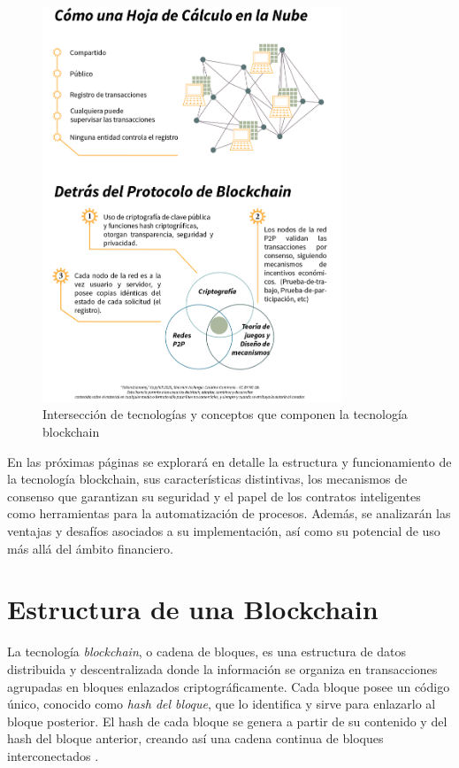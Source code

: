 \begin{figure}[!htpb]
    \centering
    \includegraphics[width=0.8\textwidth]{Figures/venn-blockchain.png}
    \caption{Intersección de tecnologías y conceptos que componen la tecnología blockchain}
    \label{fig:blockchain-venn}
\end{figure}

En las próximas páginas se explorará en detalle la estructura y funcionamiento de la tecnología blockchain, sus características distintivas, los mecanismos de consenso que garantizan su seguridad y el papel de los contratos inteligentes como herramientas para la automatización de procesos. Además, se analizarán las ventajas y desafíos asociados a su implementación, así como su potencial de uso más allá del ámbito financiero.

\section{Estructura de una Blockchain}

La tecnología \textit{blockchain}, o cadena de bloques, es una estructura de datos distribuida y descentralizada donde la información se organiza en transacciones agrupadas en bloques enlazados criptográficamente. Cada bloque posee un código único, conocido como \textit{hash del bloque}, que lo identifica y sirve para enlazarlo al bloque posterior. El hash de cada bloque se genera a partir de su contenido y del hash del bloque anterior, creando así una cadena continua de bloques interconectados \cite{tripathi2023comprehensive}.

